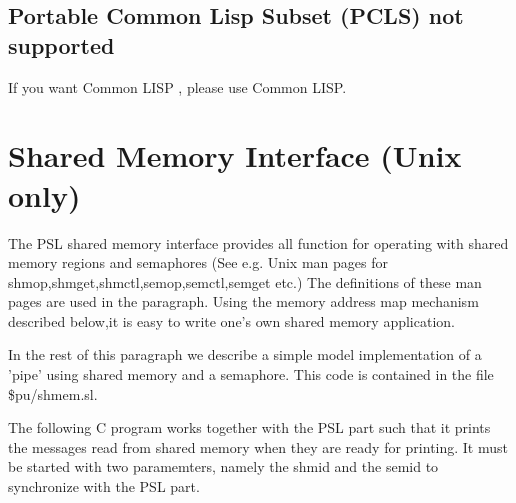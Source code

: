 \subsection{Portable Common Lisp Subset (PCLS) not supported}

If you want Common LISP , please use Common LISP.

\section{Shared Memory Interface (Unix only)}

The PSL shared memory interface provides all function for
operating with shared memory regions and semaphores
(See e.g. Unix man pages for shmop,shmget,shmctl,semop,semctl,semget etc.)
The definitions of these man pages are used in the paragraph.
Using the memory address map mechanism described below,it
is easy to write one's own shared memory application.

In the rest of this paragraph we describe a simple model
implementation of a 'pipe' using shared memory and a semaphore.
This code is contained in the file \$pu/shmem.sl.
\\






The following C program works together with the PSL part
such that it prints the messages read from shared memory
when they are ready for printing. It must be started with
two paramemters, namely the shmid and the semid to synchronize
with the PSL part.

